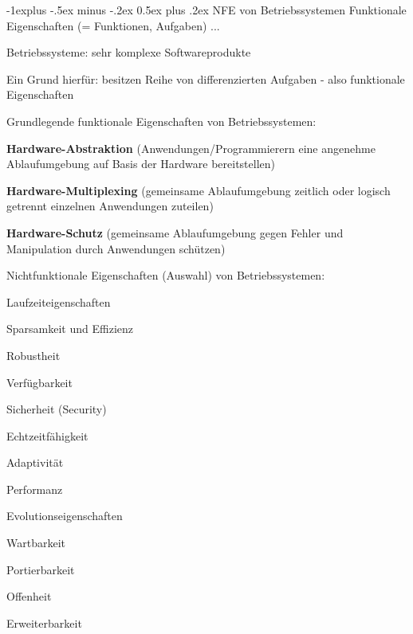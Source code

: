 \documentclass[a4paper]{article}
\makeatletter
\renewcommand{\subsection}{\@startsection{subsection}{2}{0mm}%
 {-1explus -.5ex minus -.2ex}%
 {0.5ex plus .2ex}%
 {\normalfont\normalsize\bfseries}}
\makeatother
\begin{document}
\begin{multicols}{3}
    \subsection{NFE von Betriebssystemen}
    Funktionale Eigenschaften (= Funktionen, Aufgaben) ...
    \begin{itemize*}
        \item Betriebssysteme: sehr komplexe Softwareprodukte
        \item Ein Grund hierfür: besitzen Reihe von differenzierten Aufgaben - also funktionale Eigenschaften
    \end{itemize*}

    Grundlegende funktionale Eigenschaften von Betriebssystemen:
    \begin{enumerate*}
        \item \textbf{Hardware-Abstraktion} (Anwendungen/Programmierern eine angenehme Ablaufumgebung auf Basis der Hardware bereitstellen)
        \item \textbf{Hardware-Multiplexing} (gemeinsame Ablaufumgebung zeitlich oder logisch getrennt einzelnen Anwendungen zuteilen)
        \item \textbf{Hardware-Schutz} (gemeinsame Ablaufumgebung gegen Fehler und Manipulation durch Anwendungen schützen)
    \end{enumerate*}

    Nichtfunktionale Eigenschaften (Auswahl) von Betriebssystemen:
    \begin{itemize*}
        \item Laufzeiteigenschaften
        \begin{itemize*}
            \item Sparsamkeit und Effizienz
            \item Robustheit
            \item Verfügbarkeit
            \item Sicherheit (Security)
            \item Echtzeitfähigkeit
            \item Adaptivität
            \item Performanz
        \end{itemize*}
        \item Evolutionseigenschaften
        \begin{itemize*}
            \item Wartbarkeit
            \item Portierbarkeit
            \item Offenheit
            \item Erweiterbarkeit
        \end{itemize*}
    \end{itemize*}


\end{multicols}
\end{document}
